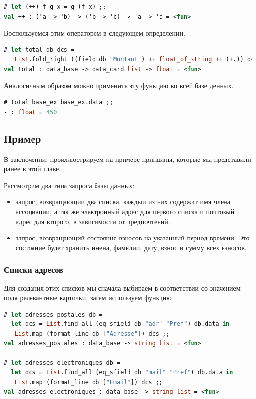 \begin{lstlisting}[language=OCaml]
# let (++) f g x = g (f x) ;;
val ++ : ('a -> 'b) -> ('b -> 'c) -> 'a -> 'c = <fun>
\end{lstlisting}

Воспользуемся этим оператором в следующем определении.

\begin{lstlisting}[language=OCaml]
# let total db dcs =
   List.fold_right ((field db "Montant") ++ float_of_string ++ (+.)) dcs 0.0 ;;
val total : data_base -> data_card list -> float = <fun>
\end{lstlisting}

Аналогичным образом можно применить эту функцию ко всей базе денных.

\begin{lstlisting}[language=OCaml]
# total base_ex base_ex.data ;;
- : float = 450
\end{lstlisting}

\subsection{Пример}
\label{subsec:an_example}

В заключении, проиллюстрируем на примере принципы, которые мы представили ранее 
в этой главе.

Рассмотрим два типа запроса базы данных:

\begin{itemize}
	\item запрос, возвращающий два списка, каждый из них содержит имя члена 
ассоциации, а так же электронный адрес для первого списка и почтовый адрес для 
второго, в зависимости от предпочтений.

	\item запрос, возвращающий состояние взносов на указанный период времени. 
Это  состояние будет хранить имена, фамилии, дату, взнос и сумму всех взносов.
\end{itemize}

\subsubsection{Списки адресов}

Для создания этих списков мы сначала выбираем в соответствии со значением поля 
 релевантные карточки, затем используем функцию 
.

\begin{lstlisting}[language=OCaml]
# let adresses_postales db =
  let dcs = List.find_all (eq_sfield db "adr" "Pref") db.data in
   List.map (format_line db ["Adresse"]) dcs ;;
val adresses_postales : data_base -> string list = <fun>

# let adresses_electroniques db =
  let dcs = List.find_all (eq_sfield db "mail" "Pref") db.data in
   List.map (format_line db ["Email"]) dcs ;;
val adresses_electroniques : data_base -> string list = <fun>
\end{lstlisting}


